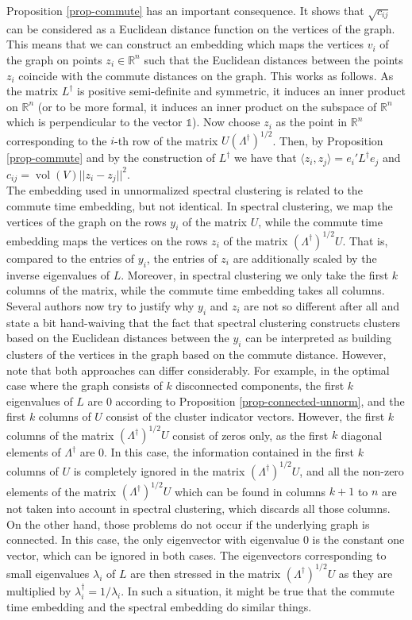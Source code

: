 \documentclass{article}
\newcommand{\RR}{\mathbb{R}}
\newcommand{\R}{\RR}
\DeclareMathOperator{\vol}{vol} %
\newcommand{\charfct}{\mathbb{1}}
\newcommand{\Lun}{L}
\begin{document}
Proposition \ref{prop-commute} has an important consequence. It shows
that $\sqrt{c_{ij}}$ can be considered as a Euclidean distance
function on the vertices of the graph. This means that we can
construct an embedding which maps the vertices $v_i$ of the graph on
points $z_i \in \R^n$ such that the Euclidean distances between the
points $z_i$ coincide with the commute distances on the graph. This
works as follows. As the matrix $\Lun^\dagger$ is positive
semi-definite and symmetric, it induces an inner product on $\R^n$ (or
to be more formal, it induces an inner product on the subspace of
$\R^n$ which is perpendicular to the vector $\charfct$).  Now choose
$z_i$ as the point in $\R^n$ corresponding to the $i$-th row of the
matrix $U (\Lambda^\dagger)^{1/2}$. Then, by Proposition
\ref{prop-commute} and by the construction of $\Lun^\dagger$ we have
that $\langle z_i, z_j \rangle = e_i'\Lun^\dagger
e_j$ and $c_{ij} = \vol(V) ||z_i - z_j||^2$. \\

The embedding used in unnormalized spectral clustering is related to
the commute time embedding, but not identical. In spectral clustering,
we map the vertices of the graph on the rows $y_i$ of the matrix $U$,
while the commute time embedding maps the vertices on the rows $z_i$
of the matrix $ (\Lambda^\dagger)^{1/2} U $. That is, compared to the
entries of $y_i$, the entries of $z_i$ are additionally scaled by the
inverse eigenvalues of $\Lun$. Moreover, in spectral clustering we
only take the first $k$ columns of the matrix, while the commute time
embedding takes all columns.  Several authors now try to justify why
$y_i$ and $z_i$ are not so different after all and state a bit
hand-waiving that the fact that spectral clustering constructs
clusters based on the Euclidean distances between the $y_i$ can be
interpreted as building clusters of the vertices in the graph based on
the commute distance.
%
However, note that both approaches can differ considerably. For example, in the optimal case
where the graph consists of
$k$  disconnected components, the first $k$
eigenvalues of $L$ are 0 according to Proposition
\ref{prop-connected-unnorm}, and the first $k$ columns of $U$ consist
of the cluster indicator vectors. However, the first $k$ columns of
the matrix $ (\Lambda^\dagger)^{1/2} U $ consist of zeros only, as the
first $k$ diagonal elements of $\Lambda^\dagger$ are $0$. In this
case, the information contained in the first $k$ columns of $U$ is
completely ignored in the matrix $ (\Lambda^\dagger)^{1/2} U $, and
all the non-zero elements of the matrix $ (\Lambda^\dagger)^{1/2} U $
which can be found in columns $k+1$ to $n$ are not taken into account
in spectral clustering, which discards all those columns. 
%
On the other hand, those problems do not occur if the underlying graph
is connected. In this case, the only eigenvector with eigenvalue $0$
is the constant one vector, which can be ignored in both cases. The
eigenvectors corresponding to small eigenvalues $\lambda_i$ of $L$ are
then stressed in the matrix $ (\Lambda^\dagger)^{1/2} U $ as they are
multiplied by $\lambda_i^\dagger = 1/\lambda_i$. In such a situation,
it might be true that the commute time embedding and the spectral
embedding do similar things.\\
\end{document}
